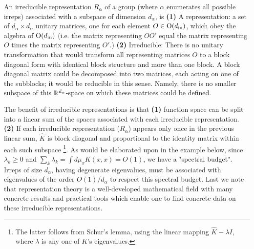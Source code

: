 An irreducible representation $R_{\alpha}$ of a group (where $\alpha$ enumerates all possible irreps) associated with a subspace of dimension $d_{\alpha}$, is {\bf (1)} A representation: a set of $d_{\alpha} \times d_{\alpha}$ unitary matrices, one for each element $O \in {\rm O}(d_{\text{in}})$, which obey the algebra of ${\rm O}(d_{\text{in}})$ (i.e. the matrix representing $OO'$ equal the matrix representing $O$ times the matrix representing $O'$.) {\bf (2)} Irreducible: There is no unitary transformation that would transform all representing matrices $O$ to a block diagonal form with identical block structure and more than one block. A block diagonal matrix could be decomposed into two matrices, each acting on one of the subblocks; it would be reducible in this sense. Namely, there is no smaller subspace of this ${\mathbb{R}}^{d_{\alpha}}$-space on which these matrices could be defined. 

The benefit of irreducible representations is that {\bf (1)} function space can be split into a 
linear sum of the spaces associated with each irreducible representation. {\bf (2)} If each irreducible representation ($R_{\alpha}$) appears only once in the previous linear sum, $\hat{K}$ is block diagonal and proportional to the identity matrix within each such subspace \footnote{The latter follows from Schur's lemma, using the linear mapping $\hat{K}-\lambda I$, where $\lambda$ is any one of $K$'s eigenvalues.}. %
As would be elaborated upon in the example below, since $\lambda_k \geq 0$ and $\sum_k \lambda_k=\int d\mu_x K(x,x)=O(1)$, we have a "spectral budget". Irreps of size $d_{\alpha}$, having degenerate eigenvalues, must be associated with eigenvalues of the order $O(1)/d_{\alpha}$ to respect this spectral budget. 
Last we note that representation theory is a well-developed mathematical field \citep{fulton_representation_2004} with many concrete results and practical tools which enable one to find concrete data on these irreducible representations. 

